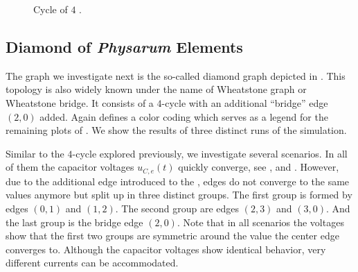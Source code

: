 		\begin{figure}
			\centering
			\qquad
			\newline
			\qquad
			\newline
			\qquad
			\newline
			\qquad
			
			\caption[Simulation - Cycles]{Cycle of $4$ \Pes.}
			\label{fig:cycle}
		\end{figure}

		\FloatBarrier

	\subsection{Diamond of \emph{Physarum} Elements}

		The graph we investigate next is the so-called diamond graph depicted in . This topology is also widely known under the name of Wheatstone graph or Wheatstone bridge. It consists of a $4$-cycle with an additional ``bridge'' edge $(2,0)$ added. Again  defines a color coding which serves as a legend for the remaining plots of . We show the results of three distinct runs of the simulation.

		Similar to the $4$-cycle explored previously, we investigate several scenarios. In all of them the capacitor voltages $u_{C,e}(t)$ quickly converge, see ,  and . However, due to the additional edge introduced to the \Pn, edges do not converge to the same values anymore but split up in three distinct groups. The first group is formed by edges $(0,1)$ and $(1,2)$. The second group are edges $(2,3)$ and $(3,0)$. And the last group is the bridge edge $(2,0)$. Note that in all scenarios the voltages show that the first two groups are symmetric around the value the center edge converges to. Although the capacitor voltages show identical behavior, very different currents can be accommodated.

